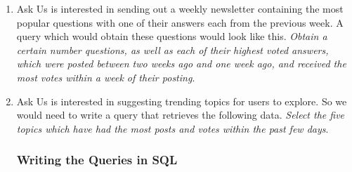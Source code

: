 \begin{enumerate}
	\item
	Ask Us is interested in sending out a weekly newsletter containing the most popular questions with one of their answers each from the previous week. A query which would obtain these questions would look like this. \emph{Obtain a certain number questions, as well as each of their highest voted answers, which were posted between two weeks ago and one week ago, and received the most votes within a week of their posting}.

	\item
	Ask Us is interested in suggesting trending topics for users to explore. So we would need to write a query that retrieves the following data. \emph{Select the five topics which have had the most posts and votes within the past few days}.

	\subsubsection{Writing the Queries in SQL}
\end{enumerate}
